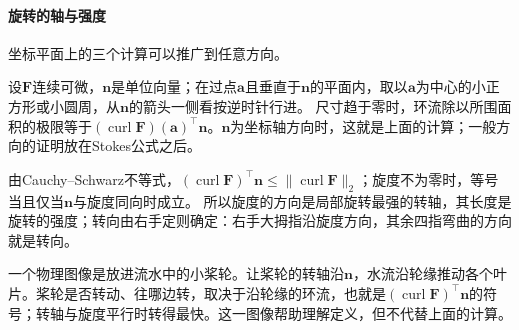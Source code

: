 \paragraph{旋转的轴与强度}

坐标平面上的三个计算可以推广到任意方向。

设$\bm F$连续可微，$\bm n$是单位向量；在过点$\bm a$且垂直于$\bm n$的平面内，取以$\bm a$为中心的小正方形或小圆周，从$\bm n$的箭头一侧看按逆时针行进。
尺寸趋于零时，环流除以所围面积的极限等于$(\operatorname{curl}\bm F)(\bm a)^\top\bm n$。$\bm n$为坐标轴方向时，这就是上面的计算；一般方向的证明放在Stokes公式之后。

由Cauchy--Schwarz不等式，$(\operatorname{curl}\bm F)^\top\bm n\leq\lVert\operatorname{curl}\bm F\rVert_2$；旋度不为零时，等号当且仅当$\bm n$与旋度同向时成立。
所以旋度的方向是局部旋转最强的转轴，其长度是旋转的强度；转向由右手定则确定：右手大拇指沿旋度方向，其余四指弯曲的方向就是转向。

一个物理图像是放进流水中的小桨轮。让桨轮的转轴沿$\bm n$，水流沿轮缘推动各个叶片。桨轮是否转动、往哪边转，取决于沿轮缘的环流，也就是$(\operatorname{curl}\bm F)^\top\bm n$的符号；转轴与旋度平行时转得最快。这一图像帮助理解定义，但不代替上面的计算。

